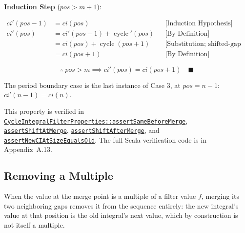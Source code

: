 \textbf{Induction Step} ($pos > m + 1$):

\begin{equation*}
\begin{aligned}
ci'(pos - 1) &= ci(pos)
  &&\text{[Induction Hypothesis]} \\
ci'(pos) &= ci'(pos - 1) + \operatorname{cycle}'(pos)
  &&\text{[By Definition]} \\
&= ci(pos) + \operatorname{cycle}(pos + 1)
  &&\text{[Substitution; shifted-gap definition]} \\
&= ci(pos + 1)
  &&\text{[By Definition]}
\end{aligned}
\end{equation*}

\begin{equation*}
\therefore \ pos > m \implies ci'(pos) = ci(pos + 1) \quad \blacksquare
\end{equation*}

The period boundary case is the last instance of Case 3, at $pos = n - 1$:
$ci'(n - 1) = ci(n)$.

{\raggedright
This property is verified in
\href{https://github.com/thiagomata/prime-numbers/blob/integral-cycle-article-v1.0.0/src/main/scala/v1/chapter4/cycle/integral/recursive/properties/CycleIntegralFilterProperties.scala}{\texttt{CycleIntegralFilterProperties::\allowbreak assertSameBeforeMerge}},
\href{https://github.com/thiagomata/prime-numbers/blob/integral-cycle-article-v1.0.0/src/main/scala/v1/chapter4/cycle/integral/recursive/properties/CycleIntegralFilterProperties.scala}{\texttt{assertShiftAtMerge}},
\href{https://github.com/thiagomata/prime-numbers/blob/integral-cycle-article-v1.0.0/src/main/scala/v1/chapter4/cycle/integral/recursive/properties/CycleIntegralFilterProperties.scala}{\texttt{assertShiftAfterMerge}},
and
\href{https://github.com/thiagomata/prime-numbers/blob/integral-cycle-article-v1.0.0/src/main/scala/v1/chapter4/cycle/integral/recursive/properties/CycleIntegralFilterProperties.scala}{\texttt{assertNewCIAtSizeEqualsOld}}.
The full Scala verification code is in Appendix~A.13.
\par}

\subsection{Removing a Multiple}

When the value at the merge point is a multiple of a filter value $f$,
merging its two neighboring gaps removes it from the sequence entirely:
the new integral's value at that position is the old integral's next
value, which by construction is not itself a multiple.

